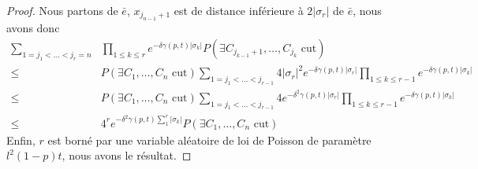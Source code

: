 \documentclass[titlepage,a4paper,12pt]{article}
\begin{document}
\begin{proof}
Nous partons de $\bar{e}$, $x_{j_{n-1}+1}$ est de distance inférieure à $2|\sigma_r|$ de $\bar{e}$, nous avons donc 
\begin{align*}\sum_{1=j_1<\dots < j_r = n} &\prod_{1\leqslant k \leqslant r} e^{-\delta \gamma(p,t)|\sigma_k|} P(\exists C_{j_{k-1}+1},\dots,C_{j_k} \text{ cut}) \\
\leqslant & P(\exists C_1,\dots,C_n \text{ cut})\sum_{1=j_1<\dots < j_{r-1}} 4|\sigma_r|^2e^{-\delta \gamma(p,t)|\sigma_r|}\prod_{1\leqslant k \leqslant r-1}e^{-\delta \gamma(p,t)|\sigma_k|} \\
\leqslant & P(\exists C_1,\dots,C_n \text{ cut})\sum_{1=j_1<\dots < j_{r-1}} 4e^{-\delta^2 \gamma(p,t)|\sigma_r|}\prod_{1\leqslant k \leqslant r-1}e^{-\delta \gamma(p,t)|\sigma_k|} \\
\leqslant & 4^r e^{-\delta^2 \gamma(p,t)\sum_1^r|\sigma_k|}P(\exists C_1,\dots,C_n \text{ cut})
\end{align*}
Enfin, $r$ est borné par une variable aléatoire de loi de Poisson de paramètre $l^2 (1-p) t$, nous avons le résultat.
\end{proof}
\end{document}
